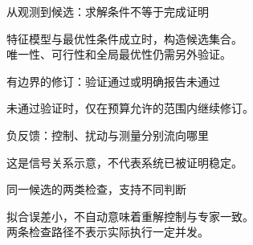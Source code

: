 \documentclass[aspectratio=169,UTF8,fontset=fandol]{ctexbeamer}
\begin{document}
\begin{frame}{从观测到候选：求解条件不等于完成证明}
  \centering
  
  \par\vspace{0.7cm}
  特征模型与最优性条件成立时，构造候选集合。\\[0.2cm]
  唯一性、可行性和全局最优性仍需另外验证。
\end{frame}
\begin{frame}{有边界的修订：验证通过或明确报告未通过}
  \centering
  
  \par\vspace{0.35cm}
  未通过验证时，仅在预算允许的范围内继续修订。
\end{frame}
\begin{frame}{负反馈：控制、扰动与测量分别流向哪里}
  \centering
  
  \par\vspace{0.35cm}
  这是信号关系示意，不代表系统已被证明稳定。
\end{frame}
\begin{frame}{同一候选的两类检查，支持不同判断}
  \centering
  
  \par\vspace{0.35cm}
  拟合误差小，不自动意味着重解控制与专家一致。\\[0.15cm]
  两条检查路径不表示实际执行一定并发。
\end{frame}
\end{document}
